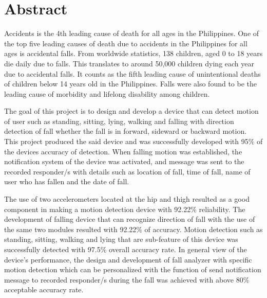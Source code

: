 \chapter*{Abstract}

Accidents is the 4th leading cause of death for all ages in the Philippines. One of the top five leading causes of death due to accidents in the Philippines for all ages is accidental falls.  From worldwide statistics, 138 children, aged 0 to 18 years die daily due to falls. This translates to around 50,000 children dying each year due to accidental falls. It counts as the
fifth leading cause of unintentional deaths of children below 14 years old in the Philippines.
Falls were also found to be the leading cause of morbidity and lifelong disability among
children. \cite{Cri14}

The goal of this project is to design and develop a device that can detect motion of user such as standing, sitting, lying, walking and falling with direction detection of fall whether the fall is in forward, sideward or backward motion. This project produced the said device and was successfully developed with 95\% of the devices accuracy of detection. When falling motion was established, the notification system of the device was activated, and message was sent to the recorded responder/s with details such as location of fall, time of fall, name of user who has fallen and the date of fall.

The use of two accelerometers located at the hip and thigh resulted as a good component
in making a motion detection device with 92.22\% reliability. The development of falling
device that can recognize direction of fall with the use of the same two modules resulted
with 92.22\% of accuracy. Motion detection such as standing, sitting, walking and lying that are sub-feature of this device was successfully detected with 97.5\% overall accuracy rate. In general view of the device’s performance, the design and development of fall analyzer with specific motion detection which can be personalized with the function of send notification message to recorded responder/s during the fall was achieved with above 80\% acceptable accuracy rate.


